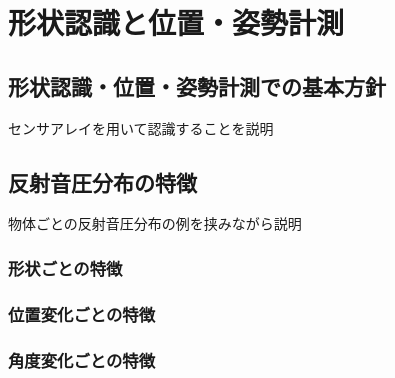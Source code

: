 \chapter{形状認識と位置・姿勢計測}

\section{形状認識・位置・姿勢計測での基本方針}
センサアレイを用いて認識することを説明
\section{反射音圧分布の特徴}
物体ごとの反射音圧分布の例を挟みながら説明
\subsection{形状ごとの特徴}

\subsection{位置変化ごとの特徴}

\subsection{角度変化ごとの特徴}
